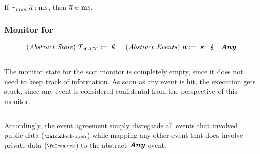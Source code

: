 \documentclass[utf8,acmsmall,review,screen,dvipsnames]{acmart}
\begin{document}
\begin{lemma}\label{lem:mon:msafe}
  If $\vdash_{mon}{\overline{a}}:{\operatorname{ms}}$, then $\overline{a}\in\operatorname{ms}$.\Coqed
\end{lemma}

\subsubsection{Monitor for }
\begin{gather*}
  \begin{aligned}
    \mathit{(Abstract\ Store)}~T_{sCCT}{}&:=\ \emptyset \hspace{0.5cm}
    \mathit{(Abstract\ Events)}~\bm{a}:=\ \bm{\varepsilon} \mid \lightning{\kern-5.5pt}\lightning \mid \bm{Any} \\
  \end{aligned}
\end{gather*}
\begin{center}
  $\;$\\
\end{center}
The monitor state for the \gls{scct} monitor is completely empty, since it does not need to keep track of information.
As soon as any event is hit, the execution gets stuck, since any event is considered confidental from the perspective of this monitor.
\begin{center}
  $\;$\\
\end{center}
Accordingly, the event agreement simply disregards all events that involved public data ($\unlock$) while mapping any other event that does involve private data ($\lock$) to the abstract $\bm{Any}$ event.
\end{document}
